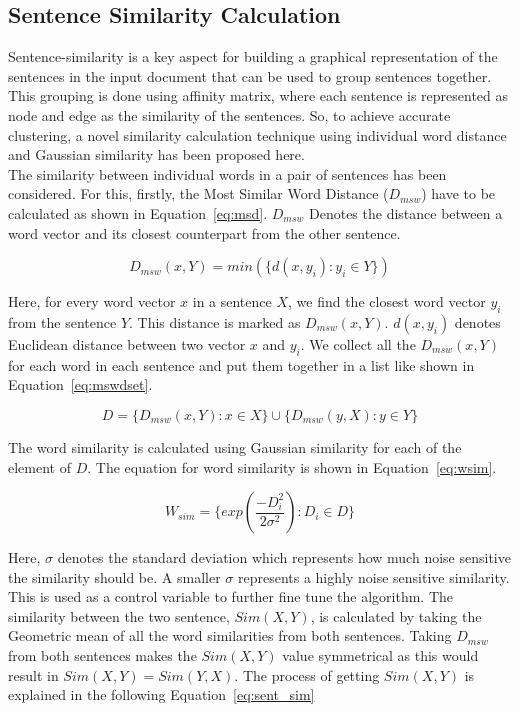\subsection{Sentence Similarity Calculation}\label{subsec:sentence-similarity-calculation}
Sentence-similarity is a key aspect for building a graphical representation of the sentences in the input document that can be used to group sentences together. This grouping is done using affinity matrix, where each sentence is represented as node and edge as the similarity of the sentences. So, to achieve accurate clustering, a novel similarity calculation technique using individual word distance and Gaussian similarity has been proposed here.\\

The similarity between individual words in a pair of sentences has been considered. For this, firstly, the Most Similar Word Distance ($D_{msw}$) have to be calculated as shown in Equation~\ref{eq:msd}. $D_{msw}$ Denotes the distance between a word vector and its closest counterpart from the other sentence.

\begin{equation}\label{eq:msd}
    D_{msw}(x,Y) = min(\{d(x,y_i) : y_i \in Y \})
\end{equation}

Here, for every word vector $x$ in a sentence $X$, we find the closest word vector $y_i$ from the sentence $Y$. This distance is marked as $D_{msw}(x,Y)$. $d(x,y_i)$ denotes Euclidean distance between two vector $x$ and $y_i$. We collect all the $D_{msw}(x,Y)$ for each word in each sentence and put them together in a list like shown in Equation~\ref{eq:mswdset}.

\begin{equation}
    D = \{D_{msw}(x,Y) : x \in X\} \cup \{D_{msw}(y,X) : y \in Y\}
    \label{eq:mswdset}
\end{equation}

The word similarity is calculated using Gaussian similarity for each of the element of $D$. The equation for word similarity is shown in Equation~\ref{eq:wsim}.

\begin{equation}\label{eq:wsim}
    W_{sim} = \{ exp\left(\frac{-D_i^2}{2\sigma^2}\right) : D_i \in D\}
\end{equation}

Here, $\sigma$ denotes the standard deviation which represents how much noise sensitive the similarity should be. A smaller $\sigma$ represents a highly noise sensitive similarity. This is used as a control variable to further fine tune the algorithm. The similarity between the two sentence, $Sim(X,Y)$, is calculated by taking the Geometric mean of all the word similarities from both sentences. Taking $D_{msw}$ from both sentences makes the $Sim(X,Y)$ value symmetrical as this would result in $Sim(X,Y) = Sim(Y,X)$. The process of getting $Sim(X,Y)$ is explained in the following Equation~\ref{eq:sent_sim}

